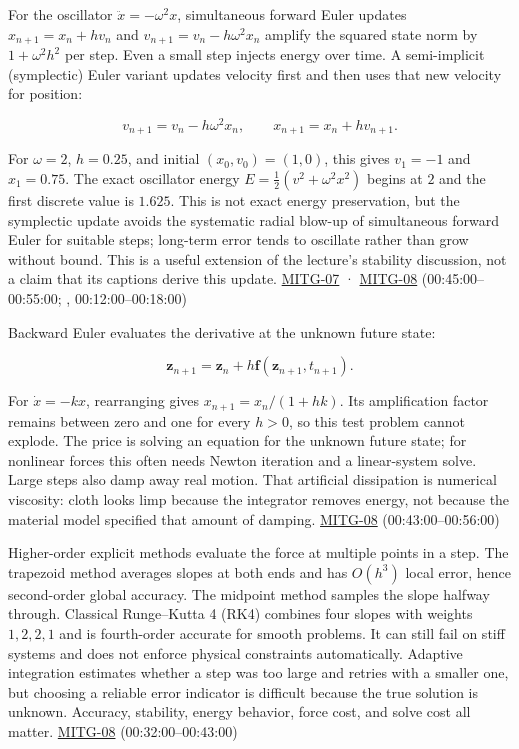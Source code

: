 For the oscillator \(\ddot{x}=-\omega^2x\), simultaneous forward Euler updates \(x_{n+1}=x_n+h v_n\) and \(v_{n+1}=v_n-h\omega^2x_n\) amplify the squared state norm by \(1+\omega^2h^2\) per step. Even a small step injects energy over time. A semi-implicit (symplectic) Euler variant updates velocity first and then uses that new velocity for position:

\[
v_{n+1}=v_n-h\omega^2x_n,\qquad x_{n+1}=x_n+h v_{n+1}.
\]

For \(\omega=2\), \(h=0.25\), and initial \((x_0,v_0)=(1,0)\), this gives \(v_1=-1\) and \(x_1=0.75\). The exact oscillator energy \(E=\frac12(v^2+\omega^2x^2)\) begins at \(2\) and the first discrete value is \(1.625\). This is not exact energy preservation, but the symplectic update avoids the systematic radial blow-up of simultaneous forward Euler for suitable steps; long-term error tends to oscillate rather than grow without bound. This is a useful extension of the lecture's stability discussion, not a claim that its captions derive this update. \hyperref[04-visual-computing-ii-ch036]{MITG-07} · \hyperref[04-visual-computing-ii-ch036]{MITG-08} (00:45:00--00:55:00; , 00:12:00--00:18:00)

Backward Euler evaluates the derivative at the unknown future state:

\[
\boldsymbol{z}_{n+1}=\boldsymbol{z}_n+h\boldsymbol{f}(\boldsymbol{z}_{n+1},t_{n+1}).
\]

For \(\dot{x}=-kx\), rearranging gives \(x_{n+1}=x_n/(1+hk)\). Its amplification factor remains between zero and one for every \(h>0\), so this test problem cannot explode. The price is solving an equation for the unknown future state; for nonlinear forces this often needs Newton iteration and a linear-system solve. Large steps also damp away real motion. That artificial dissipation is numerical viscosity: cloth looks limp because the integrator removes energy, not because the material model specified that amount of damping. \hyperref[04-visual-computing-ii-ch036]{MITG-08} (00:43:00--00:56:00)

Higher-order explicit methods evaluate the force at multiple points in a step. The trapezoid method averages slopes at both ends and has \(O(h^3)\) local error, hence second-order global accuracy. The midpoint method samples the slope halfway through. Classical Runge--Kutta 4 (RK4) combines four slopes with weights \(1,2,2,1\) and is fourth-order accurate for smooth problems. It can still fail on stiff systems and does not enforce physical constraints automatically. Adaptive integration estimates whether a step was too large and retries with a smaller one, but choosing a reliable error indicator is difficult because the true solution is unknown. Accuracy, stability, energy behavior, force cost, and solve cost all matter. \hyperref[04-visual-computing-ii-ch036]{MITG-08} (00:32:00--00:43:00)

